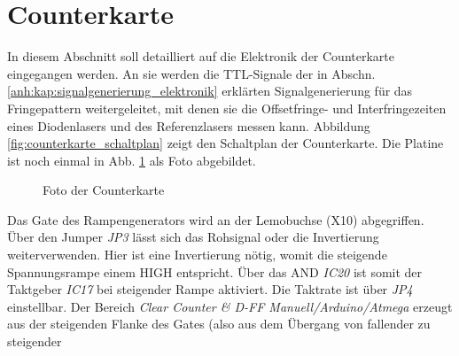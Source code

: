 \section{Counterkarte}\label{anh:sec:counterkarte}
In diesem Abschnitt soll detailliert auf die Elektronik der Counterkarte
eingegangen werden. An sie werden die TTL-Signale der in Abschn.
\ref{anh:kap:signalgenerierung_elektronik} erklärten Signalgenerierung für das
Fringepattern weitergeleitet, mit denen sie die Offsetfringe- und
Interfringezeiten eines Diodenlasers und des Referenzlasers messen kann.
Abbildung \ref{fig:counterkarte_schaltplan} zeigt den Schaltplan der
Counterkarte. Die Platine ist noch einmal in Abb.
\ref{fig:counterkarte_foto} als Foto abgebildet.\par
\begin{figure}[h]
 	\centering
	\caption[Counterkarte -	Foto]{Foto der Counterkarte}
	\label{fig:counterkarte_foto}
\end{figure}
Das Gate des Rampengenerators wird an der Lemobuchse (X10) abgegriffen.
Über den Jumper \textit{JP3} lässt sich das Rohsignal oder die Invertierung weiterverwenden.
Hier ist eine Invertierung nötig, womit die steigende Spannungsrampe einem HIGH entspricht.
Über das AND \textit{IC20} ist somit der Taktgeber \textit{IC17} bei steigender
Rampe aktiviert. Die Taktrate ist über \textit{JP4} einstellbar. Der Bereich
\textit{Clear Counter \& D-FF Manuell/Arduino/Atmega} erzeugt aus der
steigenden Flanke des Gates (also aus dem Übergang von fallender zu steigender
